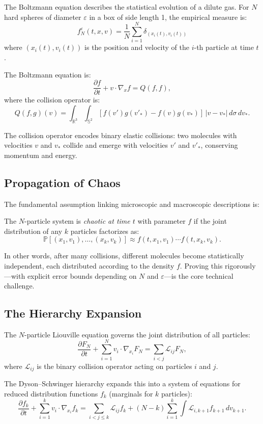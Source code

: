 The Boltzmann equation describes the statistical evolution of a dilute gas. For $N$ hard spheres of diameter $\varepsilon$ in a box of side length 1, the empirical measure is:
\[
f^\varepsilon_N(t, x, v) = \frac{1}{N} \sum_{i=1}^{N} \delta_{(x_i(t), v_i(t))}
\]
where $(x_i(t), v_i(t))$ is the position and velocity of the $i$-th particle at time $t$.

The Boltzmann equation is:
\[
\frac{\partial f}{\partial t} + v \cdot \nabla_x f = Q(f, f),
\]
where the collision operator is:
\[
Q(f, g)(v) = \int_{\mathbb{R}^3} \int_{\mathbb{S}^2} [f(v')g(v'_*) - f(v)g(v_*)] \, |v - v_*| \, d\sigma \, dv_*.
\]

The collision operator encodes binary elastic collisions: two molecules with velocities $v$ and $v_*$ collide and emerge with velocities $v'$ and $v'_*$, conserving momentum and energy.

\subsection{Propagation of Chaos}

The fundamental assumption linking microscopic and macroscopic descriptions is:

\begin{definition}
The $N$-particle system is \emph{chaotic at time $t$} with parameter $f$ if the joint distribution of any $k$ particles factorizes as:
\[
\mathbb{P}[(x_1, v_1), \ldots, (x_k, v_k)] \approx f(t, x_1, v_1) \cdots f(t, x_k, v_k).
\]
\end{definition}

In other words, after many collisions, different molecules become statistically independent, each distributed according to the density $f$. Proving this rigorously---with explicit error bounds depending on $N$ and $\varepsilon$---is the core technical challenge.

\subsection{The Hierarchy Expansion}

The $N$-particle Liouville equation governs the joint distribution of all particles:
\[
\frac{\partial F_N}{\partial t} + \sum_{i=1}^{N} v_i \cdot \nabla_{x_i} F_N = \sum_{i < j} \mathcal{L}_{ij} F_N,
\]
where $\mathcal{L}_{ij}$ is the binary collision operator acting on particles $i$ and $j$.

The Dyson--Schwinger hierarchy expands this into a system of equations for reduced distribution functions $f_k$ (marginals for $k$ particles):
\[
\frac{\partial f_k}{\partial t} + \sum_{i=1}^{k} v_i \cdot \nabla_{x_i} f_k = \sum_{i < j \le k} \mathcal{L}_{ij} f_k + (N - k) \sum_{i=1}^{k} \int \mathcal{L}_{i, k+1} f_{k+1} \, dv_{k+1}.
\]

